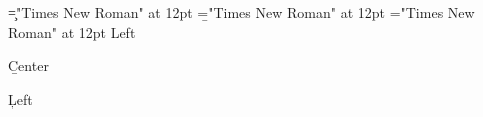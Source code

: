 \font\c="Times New Roman" at 12pt
\font\b="Times New Roman" at 12pt
\font\a="Times New Roman" at 12pt
\a Left

\centerline{\b Center
}
\c Left


\bye
